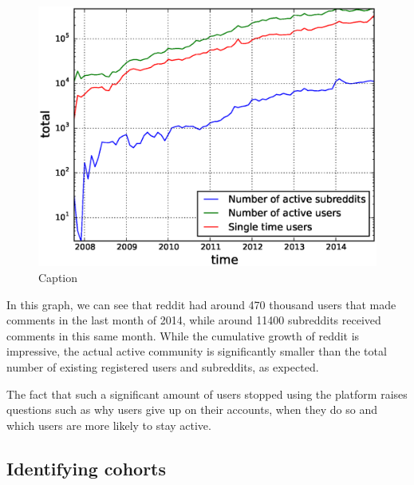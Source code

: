 \begin{figure}[!tb]
\centering
\includegraphics[scale=0.4]{./images/active_users_subreddits.eps}
\caption{Caption}
\label{fig:active_users_subreddits}
\end{figure}

In this graph, we can see that reddit had around 470 thousand users that made comments in the last month of 2014, while around 11400 subreddits received comments in this same month. While the cumulative growth of reddit is impressive, the actual active community is significantly smaller than the total number of existing registered users and subreddits, as expected.

The fact that such a significant amount of users stopped using the platform raises questions such as why users give up on their accounts, when they do so and which users are more likely to stay active. 

\subsection{Identifying cohorts}
